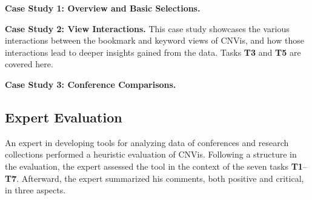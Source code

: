 \documentclass[letterpaper,twocolumn,fleqn]{article}
\begin{document}
{\bf Case Study 1: Overview and Basic Selections.} 


{\bf Case Study 2: View Interactions.} This case study showcases the various interactions between the bookmark and keyword views of CNVis, and how those interactions lead to deeper insights gained from the data. Tasks {\bf T3} and {\bf T5} are covered here.



{\bf Case Study 3: Conference Comparisons.} %


\subsection{Expert Evaluation}

An expert in developing tools for analyzing data of conferences and research collections performed a heuristic evaluation of  CNVis. Following a structure in the evaluation, the expert assessed the tool in the context of the seven tasks {\bf T1}--{\bf T7}. Afterward, the expert summarized his comments, both positive and critical, in three aspects.
\end{document}
